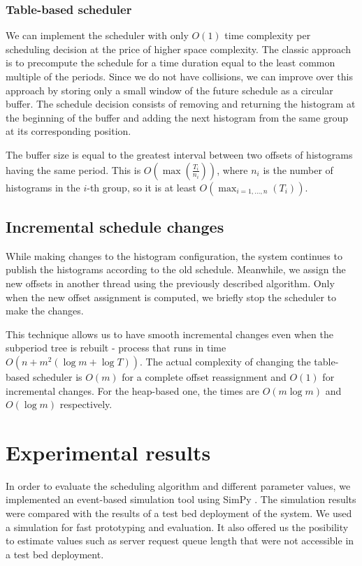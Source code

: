 \subsubsection*{Table-based scheduler}

We can implement the scheduler with only $O(1)$ time complexity per scheduling decision at the price of higher space complexity. The classic approach is to precompute the schedule for a time duration equal to the least common multiple of the periods. Since we do not have collisions, we can improve over this approach by storing only a small window of the future schedule as a circular buffer. The schedule decision consists of removing and returning the histogram at the beginning of the buffer and adding the next histogram from the same group at its corresponding position.
 
The buffer size is equal to the greatest interval between two offsets of histograms having the same period. This is  $O\left(\max\left(\frac {T_i}  {n_i}\right)\right)$, where $n_i$ is the number of histograms in the $i$-th group, so it is at least $O(\max_{i=1,\ldots,n}(T_i))$.

\subsection*{Incremental schedule changes}

While making changes to the histogram configuration, the system continues to publish the histograms according to the old schedule. Meanwhile, we assign the new offsets in another thread using the previously described algorithm. Only when the new offset assignment is computed, we briefly stop the scheduler to make the changes.

This technique allows us to have smooth incremental changes even when the subperiod tree is rebuilt - process that runs in time $O(n+m^2(\log m+\log T))$. The actual complexity of changing the table-based scheduler is $O(m)$ for a complete offset reassignment and $O(1)$ for incremental changes. For the heap-based one, the times are $O(m\log m)$ and $O(\log m)$ respectively.






\section{Experimental results}

In order to evaluate the scheduling algorithm and different parameter values, we implemented an event-based simulation tool using SimPy \citep{simpy}. The simulation results were compared with the results of a test bed deployment of the system. We used a simulation for fast prototyping and evaluation. It also offered us the posibility to estimate values such as server request queue length that were not accessible in a test bed deployment.

